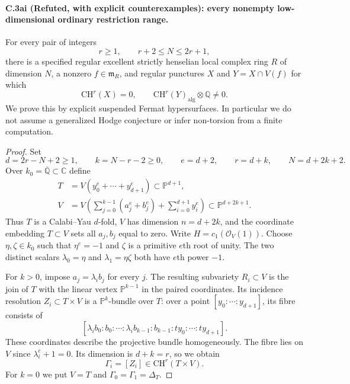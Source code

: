 \paragraph{C.3ai (Refuted, with explicit counterexamples): every nonempty low-dimensional ordinary restriction range.}
For every pair of integers
\[
       r\ge1,\qquad r+2\le N\le2r+1,
\]
there is a specified regular excellent strictly henselian local
complex ring $R$ of dimension $N$, a nonzero $f\in\mathfrak m_R$,
and regular punctures $X$ and $Y=X\cap V(f)$ for which
\[
    \mathrm{CH}^r(X)=0,
    \qquad \mathrm{CH}^r(Y)_{\mathrm{alg}}\otimes\mathbb Q\ne0.
\]
We prove this by explicit suspended Fermat hypersurfaces. In
particular we do not assume a generalized Hodge conjecture or
infer non-torsion from a finite computation.

\begin{proof}
Set
\[
 d=2r-N+2\ge1,\qquad k=N-r-2\ge0,
 \qquad e=d+2,
 \qquad r=d+k,
 \qquad N=d+2k+2.
\]
Over $k_0=\overline{\mathbb Q}\subset\mathbb C$ define
\[
 \begin{split}
 T&=V(y_0^e+\cdots+y_{d+1}^e)\subset\mathbb P^{d+1},\\
 V&=V\left(\sum_{j=0}^{k-1}(a_j^e+b_j^e)
                    +\sum_{i=0}^{d+1}y_i^e\right)
                         \subset\mathbb P^{d+2k+1}.
 \end{split}
\]
Thus $T$ is a Calabi--Yau $d$-fold, $V$ has dimension
$n=d+2k$, and the coordinate embedding $T\subset V$ sets
all $a_j,b_j$ equal to zero. Write $H=c_1(\mathcal O_V(1))$.
Choose $\eta,\zeta\in k_0$ such that $\eta^e=-1$ and
$\zeta$ is a primitive $e$th root of unity. The two distinct
scalars $\lambda_0=\eta$ and $\lambda_1=\eta\zeta$ both
have $e$th power $-1$.

For $k>0$, impose $a_j=\lambda_i b_j$ for every $j$.
The resulting subvariety $R_i\subset V$ is the join of $T$
with the linear vertex $\mathbb P^{k-1}$ in the paired
coordinates. Its incidence resolution $Z_i\subset T\times V$
is a $\mathbb P^k$-bundle over $T$: over a point
$[y_0:\cdots:y_{d+1}]$, its fibre consists of
\[
 [\lambda_i b_0:b_0:\cdots:\lambda_i b_{k-1}:b_{k-1}:
                         t y_0:\cdots:t y_{d+1}].
\]
These coordinates describe the projective bundle homogeneously.
The fibre lies on $V$ since $\lambda_i^e+1=0$.
Its dimension is $d+k=r$, so we obtain
\[
       \Gamma_i=[Z_i]\in\mathrm{CH}^{r}(T\times V).
\]
For $k=0$ we put $V=T$ and
$\Gamma_0=\Gamma_1=\Delta_T$.


\end{proof}
